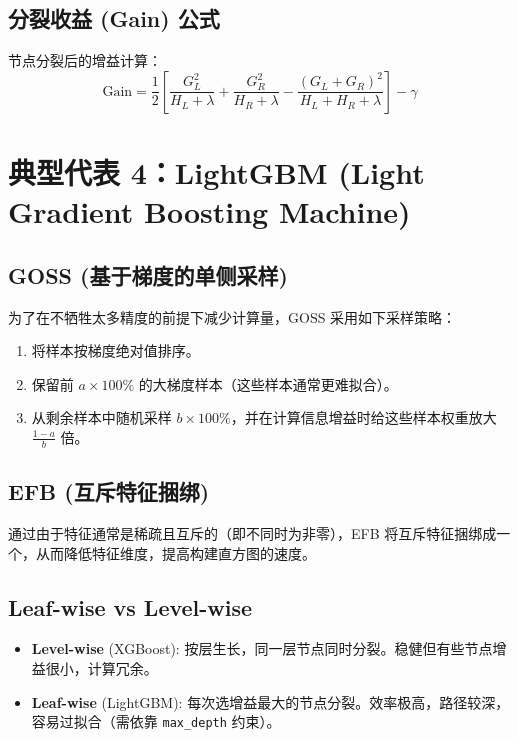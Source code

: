 \documentclass[12pt, a4paper]{article}
\begin{document}
\subsection{分裂收益 (Gain) 公式}
节点分裂后的增益计算：
$$ \text{Gain} = \frac{1}{2} \left[ \frac{G_L^2}{H_{L}+\lambda} + \frac{G_R^2}{H_{R}+\lambda} - \frac{(G_L+G_R)^2}{H_{L}+H_{R}+\lambda} \right] - \gamma $$

\section{典型代表 4：LightGBM (Light Gradient Boosting Machine)}

\subsection{GOSS (基于梯度的单侧采样)}
为了在不牺牲太多精度的前提下减少计算量，GOSS 采用如下采样策略：
\begin{enumerate}
    \item 将样本按梯度绝对值排序。
    \item 保留前 $a \times 100\%$ 的大梯度样本（这些样本通常更难拟合）。
    \item 从剩余样本中随机采样 $b \times 100\%$，并在计算信息增益时给这些样本权重放大 $\frac{1-a}{b}$ 倍。
\end{enumerate}

\subsection{EFB (互斥特征捆绑)}
通过由于特征通常是稀疏且互斥的（即不同时为非零），EFB 将互斥特征捆绑成一个，从而降低特征维度，提高构建直方图的速度。

\subsection{Leaf-wise vs Level-wise}
\begin{itemize}
    \item \textbf{Level-wise} (XGBoost): 按层生长，同一层节点同时分裂。稳健但有些节点增益很小，计算冗余。
    \item \textbf{Leaf-wise} (LightGBM): 每次选增益最大的节点分裂。效率极高，路径较深，容易过拟合（需依靠 \texttt{max\_depth} 约束）。
\end{itemize}
\end{document}
